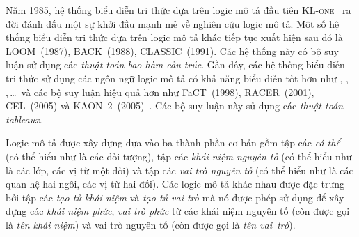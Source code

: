 Năm 1985, hệ thống biểu diễn tri thức dựa trên logic mô tả đầu tiên \textsc{KL-one}~\cite{Schmolze1983,Brachman1986} ra đời đánh dấu một sự khởi đầu mạnh mẻ về nghiên cứu logic mô tả. Một số hệ thống biểu diễn tri thức dựa trên logic mô tả khác tiếp tục xuất hiện sau đó là LOOM~(1987), BACK~(1988), CLASSIC~(1991). Các hệ thống này có bộ suy luận sử dụng các {\em thuật toán bao hàm cấu trúc}. Gần đây, các hệ thống biểu diễn tri thức sử dụng các ngôn ngữ logic mô tả có khả năng biểu diễn tốt hơn như \SHOIN, \SHOIQ, \SROIQ,\,\ldots\, và các bộ suy luận hiệu quả hơn như FaCT~(1998), RACER~(2001), CEL~(2005) và KAON~2~(2005)~\cite{Sattler2014}. Các bộ suy luận này sử dụng các {\em thuật toán tableaux}.

Logic mô tả được xây dựng dựa vào ba thành phần cơ bản gồm tập các {\em cá thể} (có thể hiểu như là các đối tượng), tập các {\em khái niệm nguyên tố} (có thể hiểu như là các lớp, các vị từ một đối) và tập các {\em vai trò nguyên tố} (có thể hiểu như là các quan hệ hai ngôi, các vị từ hai đối).
%
Các logic mô tả khác nhau được đặc trưng bởi tập các {\em tạo tử khái niệm} và {\em tạo tử vai trò} mà nó được phép sử dụng để xây dựng các {\em khái niệm phức}, {\em vai trò phức} từ các khái niệm nguyên tố (còn được gọi là {\em tên khái niệm}) và vai trò nguyên tố (còn được gọi là {\em tên vai~trò}).


